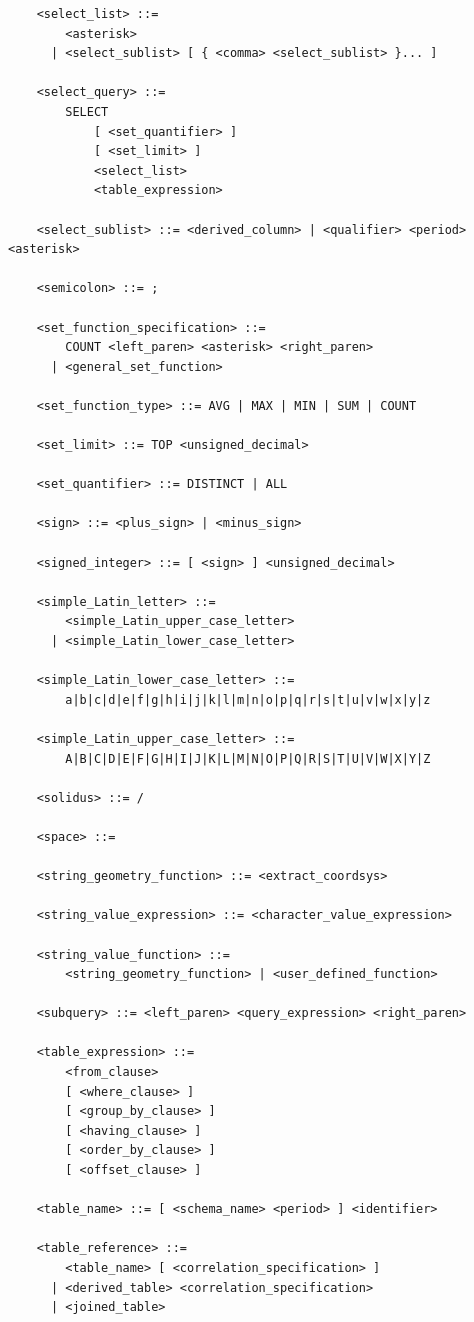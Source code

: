 \documentclass[11pt,a4paper]{ivoa}
\begin{document}
\begin{verbatim}
    <select_list> ::=
        <asterisk>
      | <select_sublist> [ { <comma> <select_sublist> }... ]

    <select_query> ::=
        SELECT
            [ <set_quantifier> ]
            [ <set_limit> ]
            <select_list>
            <table_expression>

    <select_sublist> ::= <derived_column> | <qualifier> <period> <asterisk>

    <semicolon> ::= ;

    <set_function_specification> ::=
        COUNT <left_paren> <asterisk> <right_paren>
      | <general_set_function>

    <set_function_type> ::= AVG | MAX | MIN | SUM | COUNT

    <set_limit> ::= TOP <unsigned_decimal>

    <set_quantifier> ::= DISTINCT | ALL

    <sign> ::= <plus_sign> | <minus_sign>

    <signed_integer> ::= [ <sign> ] <unsigned_decimal>

    <simple_Latin_letter> ::=
        <simple_Latin_upper_case_letter>
      | <simple_Latin_lower_case_letter>

    <simple_Latin_lower_case_letter> ::=
        a|b|c|d|e|f|g|h|i|j|k|l|m|n|o|p|q|r|s|t|u|v|w|x|y|z

    <simple_Latin_upper_case_letter> ::=
        A|B|C|D|E|F|G|H|I|J|K|L|M|N|O|P|Q|R|S|T|U|V|W|X|Y|Z

    <solidus> ::= /

    <space> ::=

    <string_geometry_function> ::= <extract_coordsys>

    <string_value_expression> ::= <character_value_expression>

    <string_value_function> ::=
        <string_geometry_function> | <user_defined_function>

    <subquery> ::= <left_paren> <query_expression> <right_paren>

    <table_expression> ::=
        <from_clause>
        [ <where_clause> ]
        [ <group_by_clause> ]
        [ <having_clause> ]
        [ <order_by_clause> ]
        [ <offset_clause> ]

    <table_name> ::= [ <schema_name> <period> ] <identifier>

    <table_reference> ::=
        <table_name> [ <correlation_specification> ]
      | <derived_table> <correlation_specification>
      | <joined_table>


\end{verbatim}
\end{document}
